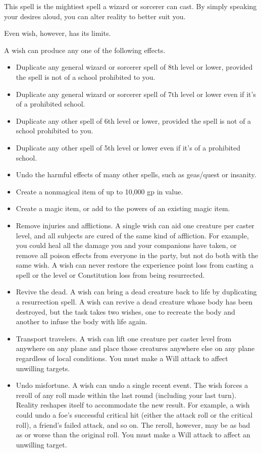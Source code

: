 \begin{spellheader}
\end{spellheader}
\spelleffect This spell is the mightiest spell a wizard or sorcerer can cast. By simply speaking your desires aloud, you can alter reality to better suit you.
\par Even wish, however, has its limits.
\par A wish can produce any one of the following effects.
\begin{itemize}
    \item Duplicate any general wizard or sorcerer spell of 8th level or lower, provided the spell is not of a school prohibited to you.
    \item Duplicate any general wizard or sorcerer spell of 7th level or lower even if it's of a prohibited school.
    \item Duplicate any other spell of 6th level or lower, provided the spell is not of a school prohibited to you.
    \item Duplicate any other spell of 5th level or lower even if it's of a prohibited school. 
    \item Undo the harmful effects of many other spells, such as geas/quest or insanity.
    \item Create a nonmagical item of up to 10,000 gp in value.
    \item Create a magic item, or add to the powers of an existing magic item.
    \item Remove injuries and afflictions. A single wish can aid one creature per caster level, and all subjects are cured of the same kind of affliction. For example, you could heal all the damage you and your companions have taken, or remove all poison effects from everyone in the party, but not do both with the same wish. A wish can never restore the experience point loss from casting a spell or the level or Constitution loss from being resurrected.
    \item Revive the dead. A wish can bring a dead creature back to life by duplicating a resurrection spell. A wish can revive a dead creature whose body has been destroyed, but the task takes two wishes, one to recreate the body and another to infuse the body with life again.
    \item Transport travelers. A wish can lift one creature per caster level from anywhere on any plane and place those creatures anywhere else on any plane regardless of local conditions. You must make a Will attack to affect unwilling targets.
    \item Undo misfortune. A wish can undo a single recent event. The wish forces a reroll of any roll made within the last round (including your last turn). Reality reshapes itself to accommodate the new result. For example, a wish could undo a foe's successful critical hit (either the attack roll or the critical roll), a friend's failed attack, and so on. The reroll, however, may be as bad as or worse than the original roll. You must make a Will attack to affect an unwilling target.
\end{itemize}
